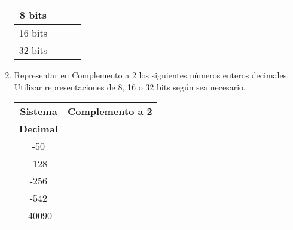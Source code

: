 \documentclass[12pt]{article}
\begin{document}
\begin{enumerate}
\begin{center}
\begin{tabular}[t]{|c|c|c|c|}
            \hline

            8 bits&&&\\

            \hline

            16 bits&&&\\

            \hline

            32 bits&&&\\

            \hline

            \end{tabular}

        \end{center}


    \item Representar en Complemento a 2 los siguientes números enteros
        decimales. Utilizar representaciones de 8, 16 o 32 bits según sea
        necesario.

        \begin{center}

            \begin{tabular}[t]{|c|c|}

            \hline

                \textbf{Sistema} & \textbf{Complemento a 2}\\

                \textbf{Decimal} & ~ \\

            \hline

                -50 & \hspace{27em}~ \\

            \hline

                -128&\\

            \hline

                -256&\\

            \hline

                -542&\\

            \hline

                -40090&\\

            \hline

            \end{tabular}


\end{center}
\end{enumerate}
\end{document}

